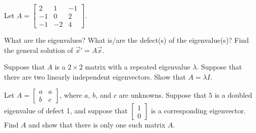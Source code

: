 \begin{exercise}
Let
$A = \left[ \begin{smallmatrix}
2 & 1 & -1 \\
-1 & 0 & 2 \\
-1 & -2 & 4
\end{smallmatrix} \right]$.
\begin{tasks}
\task What are the eigenvalues?
\task What is/are the defect(s) of the eigenvalue(s)?
\task Find the general solution of ${\vec{x}}' = A \vec{x}$.
\end{tasks}
\end{exercise}

\begin{exercise}
Suppose that $A$ is a $2 \times 2$ matrix with a repeated eigenvalue
$\lambda$.
Suppose that there are two linearly independent eigenvectors.  Show that
$A = \lambda I$.
\end{exercise}

\begin{exercise}\ansMark%
Let $A =
\left[ \begin{smallmatrix}
a & a \\
b & c
\end{smallmatrix}\right]$, where $a$, $b$, and $c$ are unknowns.
Suppose that $5$ is a doubled eigenvalue of defect 1, and suppose that
$\left[ \begin{smallmatrix}
1 \\ 0
\end{smallmatrix}\right]$ is a corresponding eigenvector.  Find $A$ and show that
there is only one such matrix $A$.
\end{exercise}


